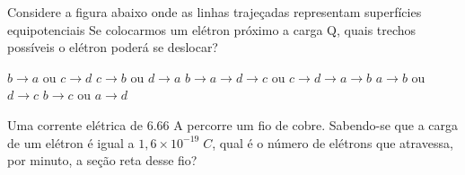 \documentclass[12pt, addpoints]{exam}
\begin{document}
    \begin{questions}
\begin{multicols*}{2}
\question Considere a figura abaixo onde as linhas trajeçadas representam superfícies equipotenciais Se colocarmos um elétron próximo a carga Q, quais trechos possíveis o elétron poderá se deslocar?
        
        \begin{center}
            \begin{minipage}[c]{0.5\linewidth}
            \end{minipage}
        \end{center}
        
        

\begin{choices}
\choice $b\rightarrow a$ ou $c\rightarrow d$ 
\choice $c\rightarrow b$ ou $d\rightarrow a$ 
\choice $b\rightarrow a\rightarrow d\rightarrow c$ ou $c\rightarrow d\rightarrow a\rightarrow b$ 
\choice $a\rightarrow b$ ou $d\rightarrow c$ 
\choice $b\rightarrow c$ ou $a\rightarrow d$ 
\end{choices}
\question Uma corrente elétrica de    6.66 A percorre um ﬁo de cobre. Sabendo-se que a carga de um elétron é igual a $1,6\times 10^{-19}\;C$, qual é o número de elétrons que atravessa, por minuto, a seção reta desse ﬁo?


\end{multicols*}
\end{questions}
\end{document}
